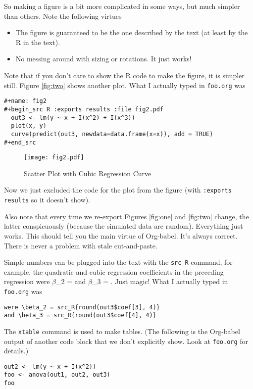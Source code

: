 \documentclass[11pt]{article}
\begin{document}
So making a figure is a bit more complicated in some ways, but much simpler
than others.  Note the following virtues
\begin{itemize}
\item The figure is guaranteed to be the one described by the text (at
least by the R in the text).
\item No messing around with sizing or rotations.  It just works!
\end{itemize}

Note that if you don't care to show the R code to make the figure, it
is simpler still.  Figure \ref{fig:two} shows another plot.  What I
actually typed in \texttt{foo.org} was
\begin{verbatim}
#+name: fig2
#+begin_src R :exports results :file fig2.pdf
  out3 <- lm(y ~ x + I(x^2) + I(x^3))
  plot(x, y)
  curve(predict(out3, newdata=data.frame(x=x)), add = TRUE)
#+end_src
\end{verbatim}


\begin{figure}[htbp]
\centering
\texttt{[image: fig2.pdf]}
\caption{\label{fig:orgd205d95}
Scatter Plot with Cubic Regression Curve}
\end{figure}

\pagebreak

Now we just excluded the code for the plot from the figure (with
\texttt{:exports results} so it doesn't show).

Also note that every time we re-export Figures \ref{fig:one}
and \ref{fig:two} change, the latter conspicuously (because the
simulated data are random).  Everything just works.  This should tell
you the main virtue of Org-babel.  It's always correct.  There is
never a problem with stale cut-and-paste.

Simple numbers can be plugged into the text with the \texttt{src\_R} command,
for example, the quadratic and cubic regression coefficients in the
preceding regression were \(\beta\)\_2 = and \(\beta\)\_3
= .  Just magic!  What I actually typed
in \texttt{foo.org} was
\begin{verbatim}
were \beta_2 = src_R{round(out3$coef[3], 4)}
and \beta_3 = src_R{round(out3$coef[4], 4)}
\end{verbatim}

The \texttt{xtable} command is used to make tables.  (The following is the
Org-babel output of another code block that we don't explicitly show.
Look at \texttt{foo.org} for details.)
\begin{verbatim}
out2 <- lm(y ~ x + I(x^2))
foo <- anova(out1, out2, out3)
foo
\end{verbatim}
\end{document}
